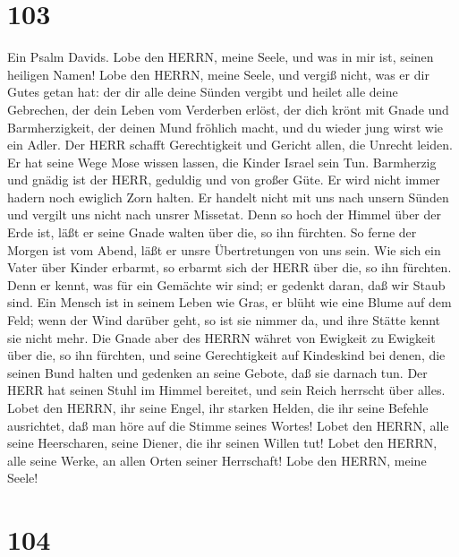 \hypertarget{section-102}{%
\section{103}\label{section-102}}

 Ein Psalm Davids. Lobe den HERRN, meine Seele, und was in
mir ist, seinen heiligen Namen!  Lobe den HERRN, meine
Seele, und vergiß nicht, was er dir Gutes getan hat:  der
dir alle deine Sünden vergibt und heilet alle deine Gebrechen,
 der dein Leben vom Verderben erlöst, der dich krönt mit
Gnade und Barmherzigkeit,  der deinen Mund fröhlich macht,
und du wieder jung wirst wie ein Adler.  Der HERR schafft
Gerechtigkeit und Gericht allen, die Unrecht leiden.  Er hat
seine Wege Mose wissen lassen, die Kinder Israel sein Tun. 
Barmherzig und gnädig ist der HERR, geduldig und von großer Güte.
 Er wird nicht immer hadern noch ewiglich Zorn halten.
 Er handelt nicht mit uns nach unsern Sünden und vergilt
uns nicht nach unsrer Missetat.  Denn so hoch der Himmel
über der Erde ist, läßt er seine Gnade walten über die, so ihn fürchten.
 So ferne der Morgen ist vom Abend, läßt er unsre
Übertretungen von uns sein.  Wie sich ein Vater über Kinder
erbarmt, so erbarmt sich der HERR über die, so ihn fürchten.
 Denn er kennt, was für ein Gemächte wir sind; er gedenkt
daran, daß wir Staub sind.  Ein Mensch ist in seinem Leben
wie Gras, er blüht wie eine Blume auf dem Feld;  wenn der
Wind darüber geht, so ist sie nimmer da, und ihre Stätte kennt sie nicht
mehr.  Die Gnade aber des HERRN währet von Ewigkeit zu
Ewigkeit über die, so ihn fürchten, und seine Gerechtigkeit auf
Kindeskind  bei denen, die seinen Bund halten und gedenken
an seine Gebote, daß sie darnach tun.  Der HERR hat seinen
Stuhl im Himmel bereitet, und sein Reich herrscht über alles.
 Lobet den HERRN, ihr seine Engel, ihr starken Helden, die
ihr seine Befehle ausrichtet, daß man höre auf die Stimme seines Wortes!
 Lobet den HERRN, alle seine Heerscharen, seine Diener, die
ihr seinen Willen tut!  Lobet den HERRN, alle seine Werke,
an allen Orten seiner Herrschaft! Lobe den HERRN, meine Seele!

\hypertarget{section-103}{%
\section{104}\label{section-103}}

